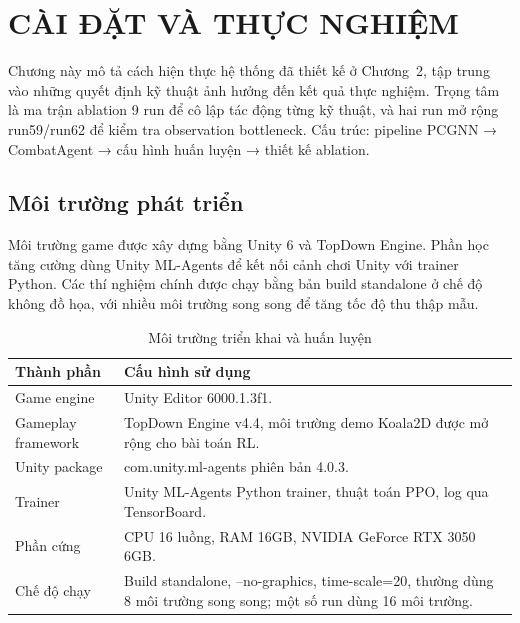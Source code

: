 \clearpage
{}

\setcounter{chapter}{2}
\chapter[CÀI ĐẶT VÀ THỰC NGHIỆM]{CÀI ĐẶT VÀ THỰC NGHIỆM}

Chương này mô tả cách hiện thực hệ thống đã thiết kế ở Chương~2, tập trung vào những quyết định kỹ thuật ảnh hưởng đến kết quả thực nghiệm. Trọng tâm là ma trận ablation 9 run để cô lập tác động từng kỹ thuật, và hai run mở rộng run59/run62 để kiểm tra observation bottleneck. Cấu trúc: pipeline PCGNN → CombatAgent → cấu hình huấn luyện → thiết kế ablation.

\section{Môi trường phát triển}

Môi trường game được xây dựng bằng Unity 6 và TopDown Engine. Phần học tăng cường dùng Unity ML-Agents để kết nối cảnh chơi Unity với trainer Python. Các thí nghiệm chính được chạy bằng bản build standalone ở chế độ không đồ họa, với nhiều môi trường song song để tăng tốc độ thu thập mẫu.

\begin{table}[H]
    \centering
    \small
    \caption{Môi trường triển khai và huấn luyện}
    \label{tab:development_environment}
    \begin{tabular}{|p{5cm}|p{8cm}|}
        \hline
        \textbf{Thành phần} & \textbf{Cấu hình sử dụng} \\
        \hline
        Game engine & Unity Editor 6000.1.3f1. \\
        \hline
        Gameplay framework & TopDown Engine v4.4, môi trường demo Koala2D được mở rộng cho bài toán RL. \\
        \hline
        Unity package & com.unity.ml-agents phiên bản 4.0.3. \\
        \hline
        Trainer & Unity ML-Agents Python trainer, thuật toán PPO, log qua TensorBoard. \\
        \hline
        Phần cứng & CPU 16 luồng, RAM 16GB, NVIDIA GeForce RTX 3050 6GB. \\
        \hline
        Chế độ chạy & Build standalone, --no-graphics, time-scale=20, thường dùng 8 môi trường song song; một số run dùng 16 môi trường. \\
        \hline
    \end{tabular}
\end{table}

